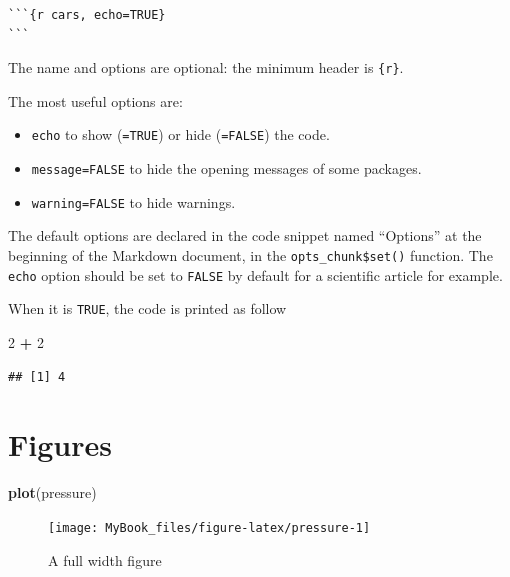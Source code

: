 \documentclass[
  12pt,
  american,
  a4paper,
  extrafontsizes,onecolumn,openright
  ]{memoir}
\newenvironment{Shaded}{\begin{snugshade}}{\end{snugshade}}
\newcommand{\DecValTok}[1]{\textcolor[rgb]{0.00,0.00,0.81}{#1}}
\newcommand{\KeywordTok}[1]{\textcolor[rgb]{0.13,0.29,0.53}{\textbf{#1}}}
\newcommand{\NormalTok}[1]{#1}
\newcommand{\OperatorTok}[1]{\textcolor[rgb]{0.81,0.36,0.00}{\textbf{#1}}}
\newcommand{\StringTok}[1]{\textcolor[rgb]{0.31,0.60,0.02}{#1}}
\providecommand{\tightlist}{%
  \setlength{\itemsep}{0pt}\setlength{\parskip}{0pt}}
\begin{document}
\begin{verbatim}
```{r cars, echo=TRUE}
```
\end{verbatim}

The name and options are optional: the minimum header is \texttt{\{r\}}.

The most useful options are:

\begin{itemize}
\tightlist
\item
  \texttt{echo} to show (\texttt{=TRUE}) or hide (\texttt{=FALSE}) the code.
\item
  \texttt{message=FALSE} to hide the opening messages of some packages.
\item
  \texttt{warning=FALSE} to hide warnings.
\end{itemize}

The default options are declared in the code snippet named \enquote{Options} at the beginning of the Markdown document, in the \texttt{opts\_chunk\$set()} function.
The \texttt{echo} option should be set to \texttt{FALSE} by default for a scientific article for example.

When it is \texttt{TRUE}, the code is printed as follow

\scriptsize

\begin{Shaded}
\begin{Highlighting}[]
\DecValTok{2} \OperatorTok{+}\StringTok{ }\DecValTok{2}
\end{Highlighting}
\end{Shaded}

\begin{verbatim}
## [1] 4
\end{verbatim}

\normalsize

\hypertarget{figures}{%
\section{Figures}\label{figures}}

\scriptsize

\begin{Shaded}
\begin{Highlighting}[]
\KeywordTok{plot}\NormalTok{(pressure)}
\end{Highlighting}
\end{Shaded}

\begin{figure}

{\centering \texttt{[image: MyBook\_files/figure-latex/pressure-1]} 

}

\caption{A full width figure}\label{fig:pressure}
\end{figure}
\end{document}
